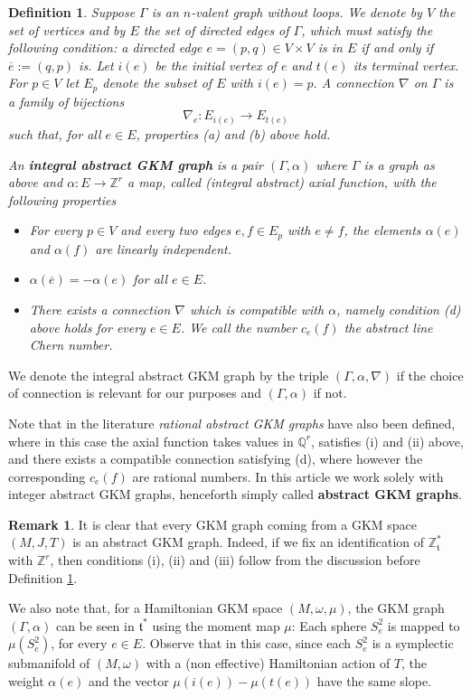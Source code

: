 \documentclass[12pt,a4paper]{amsart}
\newcommand{\ZZ}{\mathbb{Z}}
\theoremstyle{plain}
\newtheorem{defn}[thm]{Definition}
\theoremstyle{definition}
\newtheorem{rem}[thm]{Remark}
\begin{document}
\begin{defn}\label{D: GKM graph}
Suppose $\Gamma$ is an $n$-valent graph without loops. We denote by $V$ the set of
vertices and by $E$ the set of directed edges of $\Gamma$, which must satisfy the following condition: a directed edge $e=(p,q)\in V\times V$
is in $E$ if and only if $\overline{e}:=(q,p)$ is.
Let $i(e)$ be the initial vertex of $e$ and $t(e)$ its terminal
vertex. For $p \in V$ let $E_{p}$ denote the subset of $E$ with $i(e)=p$. 
A \emph{connection} $\nabla$ on $\Gamma$ is a family of bijections
\[
	\nabla_{e} \colon E_{i(e)} \longrightarrow E_{t(e)}
\]
such that, for all $e \in E$, properties (a) and (b) above hold.

An \textbf{integral abstract GKM graph} is a pair $(\Gamma, \alpha)$ where $\Gamma$ is a
graph as above and $\alpha \colon E \to \mathbb{Z}^{r}$ a map, called \emph{(integral abstract) axial function}, 
with the following properties
\begin{itemize}
	\item[(i)] For every $p \in V$ and every two edges $e,f \in E_{p}$ with $e \neq f$,
		the elements $\alpha(e)$ and $\alpha(f)$ are linearly independent.
	\item[(ii)] $\alpha(\overline{e})=-\alpha(e)$ for all $e \in E$.
	\item[(iii)] There exists a connection $\nabla$ which is \emph{compatible} with $\alpha$, namely
	condition (d) above holds for every $e\in E$. 
		We call the number $c_{e}(f)$ the \emph{abstract line Chern number}.
\end{itemize}
\end{defn}
We denote the integral abstract GKM graph by the triple $(\Gamma,\alpha,\nabla)$ if the choice of
connection is relevant for our purposes and $(\Gamma,\alpha)$ if not. 

Note that in the literature \emph{rational abstract GKM graphs} have also been defined, where in this case the axial function 
takes values
in $\mathbb{Q}^r$, 
satisfies (i) and (ii) above, and there exists a compatible connection satisfying (d), where however the corresponding 
$c_e(f)$ are rational numbers. 
In this article we work solely with integer abstract GKM graphs, henceforth simply
called \textbf{abstract GKM graphs}. 

\begin{rem}\label{R: Existence of GKM graph}
It is clear that every GKM graph coming from a GKM space $(M,J,T)$ is an abstract GKM graph. 
Indeed, if we fix an identification of $\mathbb{Z}_{\mathfrak{t}}^*$
with $\ZZ^r$, then conditions (i), (ii) and (iii) follow
from the discussion before Definition \ref{D: GKM graph}.

We also note that, for a Hamiltonian GKM space $(M,\omega, \mu)$, the GKM graph $(\Gamma, \alpha)$
can be seen in $\mathfrak{t}^{\ast}$ using the moment map 
$\mu$: Each sphere $S^2_e$ is mapped to $\mu(S^2_e)$, for every $e\in E$.
 Observe that in this case, since each $S^2_e$ is a symplectic submanifold of $(M,\omega)$ with a (non effective) Hamiltonian action of $T$, the weight $\alpha(e)$
and the vector $\mu(i(e))-\mu(t(e))$ have the same slope.
\end{rem}
\end{document}
